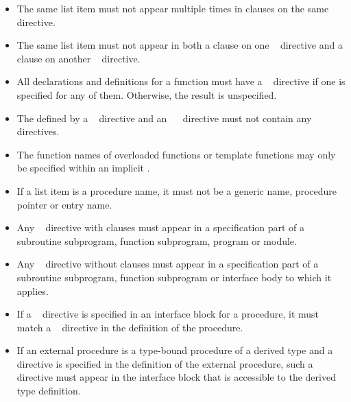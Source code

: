 {{{{\begin{itemize}
\item The same list item must not appear multiple times in clauses on the same directive.

\item The same list item must not appear in both a  clause on one
~ directive and a  clause on
another ~ directive.

\ccppspecificstart
\item All declarations and definitions for a function must have a 
      ~ directive if one is specified for 
      any of them. Otherwise, the result is unspecified.

\item The  defined by a 
      ~ directive and an 
      ~~ directive must not contain
      any ~ directives.
\end{itemize}
\ccppspecificend

\cppspecificstart
\begin{itemize}
\item The function names of overloaded functions or template functions
may only be specified within an implicit .
\end{itemize}
\cppspecificend

\fortranspecificstart
\begin{itemize}
\item If a list item is a procedure name, it must not be a generic name, 
      procedure pointer or entry name.

\item Any ~ directive with clauses must appear 
      in a specification part of a subroutine subprogram, function subprogram,
      program or module.

\item Any ~ directive without clauses must appear 
      in a specification part of a subroutine subprogram, function subprogram 
      or interface body to which it applies.

\item If a ~ directive is specified in an 
      interface block for a procedure, it must match a 
      ~ directive in the definition of the 
      procedure.

\item If an external procedure is a type-bound procedure of a derived 
      type and a ~ directive is specified in 
      the definition of the external procedure, such a directive must 
      appear in the interface block that is accessible to the derived 
      type definition.


\end{itemize}}}}}
